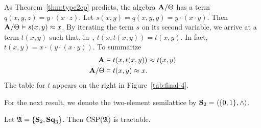 \begin{example}
As Theorem~\ref{thm:type2cp} predicts, the algebra $\mathbf{A}/\Theta$ has a \malcev term $q(x,y,z)=y\cdot(x\cdot z)$. 
Let $s(x,y) = q(x,y,y) = y\cdot(x\cdot y)$. Then $\mathbf{A}/\Theta\vDash s(x,y)\approx x$. By iterating the term $s$ on its second variable, we arrive at a term $t(x,y)$ such that, in~\bA, $t(x,t(x,y)) = t(x,y)$. In fact, $t(x,y)=x\cdot(y\cdot(x\cdot y))$. To summarize
\begin{align*}
\mathbf{A} &\vDash t(x,t(x,y)) \approx t(x,y) \\
\mathbf{A}/\Theta &\vDash t(x,y) \approx x.
\end{align*}
The table for $t$ appears on the right in Figure~\ref{tab:final-4}.

For the next result, we denote
the two-element semilattice
by $\mathbf S_2=\langle\{0,1\},\wedge\rangle$.


\begin{lemma}\label{lem:sq3s2}
 Let $\mathfrak A = \{\mathbf S_2,\mathbf{Sq}_{3}\}$. Then $\operatorname{CSP}(\mathfrak A)$ is tractable.
 \end{lemma}



\end{example}
